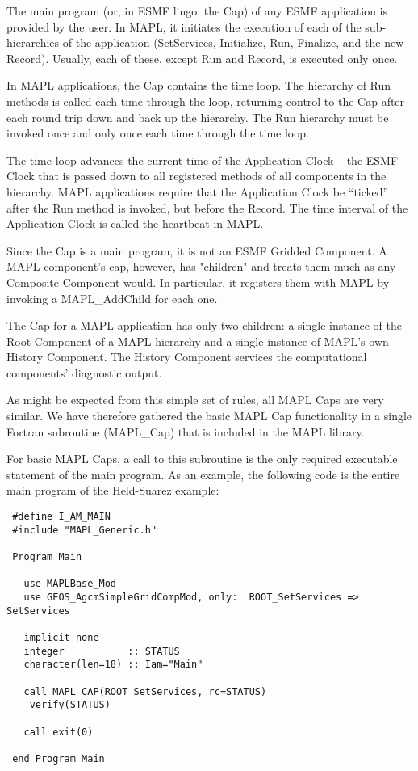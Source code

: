 
 The main program (or, in ESMF lingo, the Cap) of any ESMF application is 
 provided by the user. In MAPL, it initiates the execution of each of the
 sub-hierarchies of the application (SetServices, Initialize, Run,
 Finalize, and the new Record). Usually, each of these, except Run and Record,
 is executed only once.
 
 In MAPL applications, the Cap contains the time loop.
 The hierarchy of Run methods is called each time through the loop,
 returning control to the Cap after each round trip down and back up
 the hierarchy. The Run hierarchy must be invoked once and only once
 each time through the time loop.
 
 The time loop advances the current time of the Application Clock -- the ESMF
 Clock that is passed down to all registered methods of all components in
 the hierarchy. MAPL applications require that the Application Clock be
 ``ticked'' after the Run method is invoked, but before the Record.
 The time interval of the Application Clock is called the heartbeat in MAPL.
 
 
 Since the Cap is a main program, it is not an ESMF Gridded Component.
 A MAPL component's cap, however, has "children" and treats them much
 as any Composite Component would. In particular, it registers them with
 MAPL by invoking a MAPL\_AddChild for each one.
 
 The Cap for a MAPL application has only two children: a single instance
 of the Root Component of a MAPL hierarchy and a single instance of MAPL's
 own History Component. The History Component services the computational
 components' diagnostic output.
 
 As might be expected from this simple set of rules, all MAPL Caps are
 very similar. We have therefore gathered the basic MAPL Cap functionality
 in a single Fortran subroutine (MAPL\_Cap) that is included in the
 MAPL library.

 For basic MAPL Caps, a call to this subroutine is the only required
 executable statement of the main program. As an example, the following code
 is the entire main program of the Held-Suarez example:
 \begin{verbatim}
 #define I_AM_MAIN
 #include "MAPL_Generic.h"

 Program Main

   use MAPLBase_Mod
   use GEOS_AgcmSimpleGridCompMod, only:  ROOT_SetServices => SetServices

   implicit none
   integer           :: STATUS
   character(len=18) :: Iam="Main"

   call MAPL_CAP(ROOT_SetServices, rc=STATUS)
   _verify(STATUS)

   call exit(0)

 end Program Main
 \end{verbatim}
 
